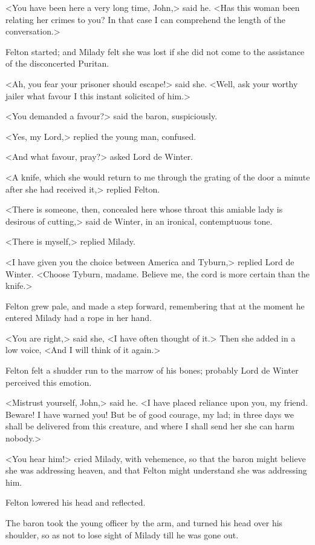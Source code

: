 <You have been here a very long time, John,> said he. <Has this woman been relating her crimes to you? In that case I can comprehend the length of the conversation.> 

Felton started; and Milady felt she was lost if she did not come to the assistance of the disconcerted Puritan. 

<Ah, you fear your prisoner should escape!> said she. <Well, ask your worthy jailer what favour I this instant solicited of him.> 

<You demanded a favour?> said the baron, suspiciously. 

<Yes, my Lord,> replied the young man, confused. 

<And what favour, pray?> asked Lord de Winter. 

<A knife, which she would return to me through the grating of the door a minute after she had received it,> replied Felton. 

<There is someone, then, concealed here whose throat this amiable lady is desirous of cutting,> said de Winter, in an ironical, contemptuous tone. 

<There is myself,> replied Milady. 

<I have given you the choice between America and Tyburn,> replied Lord de Winter. <Choose Tyburn, madame. Believe me, the cord is more certain than the knife.> 

Felton grew pale, and made a step forward, remembering that at the moment he entered Milady had a rope in her hand. 

<You are right,> said she, <I have often thought of it.> Then she added in a low voice, <And I will think of it again.> 

Felton felt a shudder run to the marrow of his bones; probably Lord de Winter perceived this emotion. 

<Mistrust yourself, John,> said he. <I have placed reliance upon you, my friend. Beware! I have warned you! But be of good courage, my lad; in three days we shall be delivered from this creature, and where I shall send her she can harm nobody.> 

<You hear him!> cried Milady, with vehemence, so that the baron might believe she was addressing heaven, and that Felton might understand she was addressing him. 

Felton lowered his head and reflected. 

The baron took the young officer by the arm, and turned his head over his shoulder, so as not to lose sight of Milady till he was gone out. 


